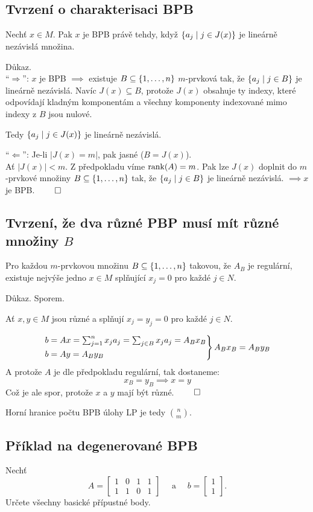 \subsection{Tvrzení o charakterisaci BPB}\label{charBPB}
Nechť $x \in M$. Pak $x$ je BPB právě tehdy, když $\left\lbrace a_j \mid j \in J(x) \right\rbrace$ je lineárně nezávislá množina.

Důkaz.\\
\enquote{$\Rightarrow$}: $x$ je BPB $\implies$ existuje $B \subseteq \left\lbrace 1, \dots, n \right\rbrace$ $m$-prvková tak, že
$\left\lbrace a_j \mid j \in B \right\rbrace$ je lineárně nezávislá. Navíc $J(x) \subseteq B$, protože $J(x)$ obsahuje ty indexy, které
odpovídají kladným komponentám a všechny komponenty indexované mimo indexy z $B$ jsou nulové.

Tedy $\left\lbrace a_j \mid j \in J(x) \right\rbrace$ je lineárně nezávislá.

\enquote{$\Leftarrow$}: Je-li $|J(x) = m|$, pak jasné ($B = J(x)$).\\
Ať $|J(x)| < m$. Z předpokladu víme $\operatorname*{rank}(A) = m$. Pak lze $J(x)$ doplnit do $m$-prvkové množiny
$B \subseteq \left\lbrace 1,\dots, n \right\rbrace$ tak, že $\left\lbrace a_j \mid j \in B \right\rbrace$ je lineárně nezávislá. $\implies x$ je BPB. $\qed$

\subsection{Tvrzení, že dva různé PBP musí mít různé množiny \texorpdfstring{$B$}{B}} \label{ruzneBPB}
Pro každou $m$-prvkovou množinu $B \subseteq \left\lbrace 1, \dots, n \right\rbrace$ takovou, že $A_B$ je regulární, existuje nejvýše jedno
$x \in M$ splňující $x_j = 0$ pro každé $j \in N$.

Důkaz. Sporem.

Ať $x, y \in M$ jsou různé a splňují $x_j = y_j = 0$ pro každé $j \in N$.

\[
    \begin{rcases}
        b = Ax = \sum_{j = 1}^{n} x_j a_j = \sum_{j \in B}x_j a_j = A_B x_B \\
        b = Ay = A_B y_B
    \end{rcases} A_B x_B = A_B y_B
\]
A protože $A$ je dle předpokladu regulární, tak dostaneme:
\[
    x_B = y_B \implies x = y
\]
Což je ale spor, protože $x$ a $y$ mají být různé. $\qed$

Horní hranice počtu BPB úlohy LP je tedy $\binom{n}{m}$.

\subsection{Příklad na degenerované BPB}
Nechť
\[
    A =
    \begin{bmatrix}
    1 & 0 & 1 & 1 \\
    1 & 1 & 0 & 1
    \end{bmatrix} \quad \text{ a } \quad b =
    \begin{bmatrix}
        1 \\
        1
    \end{bmatrix}.
\]
Určete všechny basické přípustné body.

